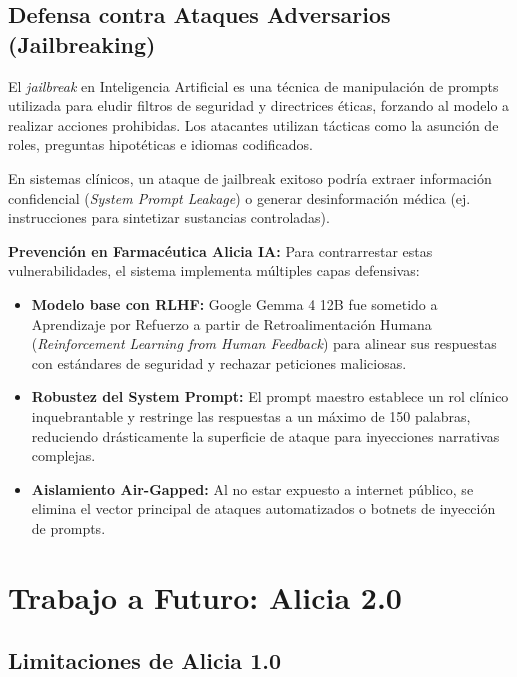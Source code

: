 \documentclass[12pt,a4paper]{article}
\begin{document}
\subsection{Defensa contra Ataques Adversarios (Jailbreaking)}

El \textit{jailbreak} en Inteligencia Artificial es una técnica de manipulación de prompts utilizada para eludir filtros de seguridad y directrices éticas, forzando al modelo a realizar acciones prohibidas. Los atacantes utilizan tácticas como la asunción de roles, preguntas hipotéticas e idiomas codificados.

En sistemas clínicos, un ataque de jailbreak exitoso podría extraer información confidencial (\textit{System Prompt Leakage}) o generar desinformación médica (ej. instrucciones para sintetizar sustancias controladas). 

\textbf{Prevención en Farmacéutica Alicia IA:}
Para contrarrestar estas vulnerabilidades, el sistema implementa múltiples capas defensivas:
\begin{itemize}
  \item \textbf{Modelo base con RLHF:} Google Gemma 4 12B fue sometido a Aprendizaje por Refuerzo a partir de Retroalimentación Humana (\textit{Reinforcement Learning from Human Feedback}) para alinear sus respuestas con estándares de seguridad y rechazar peticiones maliciosas.
  \item \textbf{Robustez del System Prompt:} El prompt maestro establece un rol clínico inquebrantable y restringe las respuestas a un máximo de 150 palabras, reduciendo drásticamente la superficie de ataque para inyecciones narrativas complejas.
  \item \textbf{Aislamiento Air-Gapped:} Al no estar expuesto a internet público, se elimina el vector principal de ataques automatizados o botnets de inyección de prompts.
\end{itemize}

\newpage

\section{Trabajo a Futuro: Alicia 2.0}

\subsection{Limitaciones de Alicia 1.0}
\end{document}

